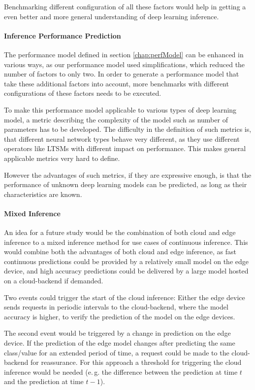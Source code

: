 Benchmarking different configuration of all these factors would help in getting a even better and more general understanding of deep learning inference.

\paragraph{Inference Performance Prediction}
The performance model defined in section \ref{chap:perfModel} can be enhanced in various ways, as our performance model used simplifications, which reduced the number of factors to only two.
In order to generate a performance model that take these additional factors into account, more benchmarks with different configurations of these factors needs to be executed.

To make this performance model applicable to various types of deep learning model, a metric describing the complexity of the model such as number of parameters has to be developed.
The difficulty in the definition of such metrics is, that different neural network types behave very different, as they use different operators like LTSMs with different impact on performance. 
This makes general applicable metrics very hard to define.

However the advantages of such metrics, if they are expressive enough, is that the performance of unknown deep learning models can be predicted, as long as their characteristics are known.
\paragraph{Mixed Inference}
An idea for a future study would be the combination of both cloud and edge inference to a mixed inference method for use cases of continuous inference.
This would combine both the advantages of both cloud and edge inference, as fast continuous predictions could be provided by a relatively small model on the edge device, and high accuracy predictions could be delivered by a large model hosted on a cloud-backend if demanded. 

Two events could trigger the start of the cloud inference: 
Either the edge device sends requests in periodic intervals to the cloud-backend, where the model accuracy is higher, to verify the prediction of the model on the edge devices.

The second event would be triggered by a change in prediction on the edge device. If the prediction of the edge model changes after predicting the same class/value for an extended period of time, a request could be made to the cloud-backend for reassurance. For this approach a threshold for triggering the cloud inference would be needed (e.\,g. the difference between the prediction at time $t$ and the prediction at time $t-1$).



